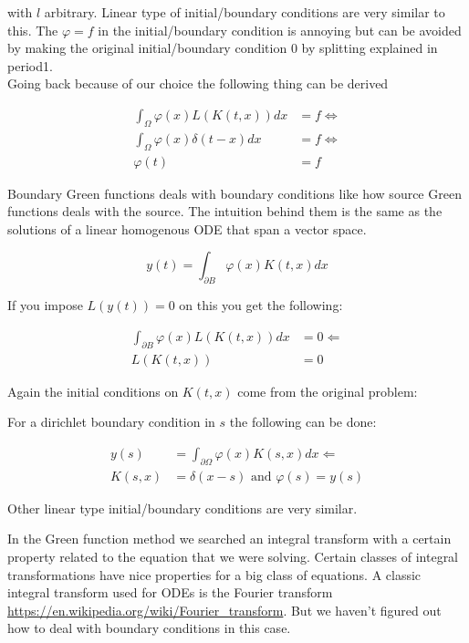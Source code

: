 with $l$ arbitrary. Linear type of initial/boundary conditions are very similar to this.
The $\varphi = f$ in the initial/boundary condition is annoying but can be avoided
by making the original initial/boundary condition $0$ by splitting explained in period1.\\

Going back because of our choice the following thing can be derived

\begin{align*}
    \int_{\Omega} \varphi(x) L \left(K(t,x) \right)dx & = f \Leftrightarrow \\
    \int_{\Omega} \varphi(x) \delta(t-x)dx            & = f \Leftrightarrow \\
    \varphi(t)                                        & = f
\end{align*}

Boundary Green functions deals with boundary conditions like how source Green functions deals with the source. The intuition behind them is the same as the solutions of a linear homogenous ODE that span a vector space.

$$
    y(t)= \int_{\partial B} \varphi(x) K(t,x) dx
$$

If you impose $L(y(t)) = 0$ on this you get the following:

\begin{align*}
    \int_{\partial B} \varphi(x) L(K(t,x)) dx & = 0 \Leftarrow \\
    L(K(t,x))                                 & = 0
\end{align*}

Again the initial conditions on $K(t,x)$ come from the original problem:

For a dirichlet boundary condition in $s$ the following can be done:

\begin{align*}
    y(s)   & = \int_{\partial \Omega} \varphi(x) K(s,x)dx \Leftarrow \\
    K(s,x) & = \delta(x-s) \text{ and } \varphi(s)= y(s)
\end{align*}

Other linear type initial/boundary conditions are very similar.

In the Green function method we searched an integral transform with a certain property
related to the equation that we were solving. Certain classes of integral
transformations have nice properties for a big class of equations.
A classic integral transform used for ODEs is the Fourier transform
\url{https://en.wikipedia.org/wiki/Fourier_transform}.
But we haven't figured
out how to deal with boundary conditions in this case.


